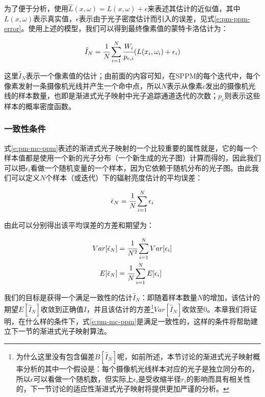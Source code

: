 为了便于分析，\cite{a:ProgressivePhotonMappingAProbabilisticApproach}使用$\hat{L}(x,\omega)=L(x,\omega)+\epsilon$来表述其估计的近似值，其中$L(x,\omega)$表示真实值，$\epsilon$表示由于光子密度估计而引入的误差，见式\ref{e:pm-ppm-error}。使用上述的模型，我们可以得到最终像素值的蒙特卡洛估计为：

\begin{equation}\label{e:pm-mc-ppm}
	\hat{I}_N= \cfrac{1}{N}\sum^{N}_{i=1} \cfrac{W_i}{p_{e,i}}(L(x_i,\omega_i)+\epsilon_i)
\end{equation}

\noindent 这里$\hat{I}_N$表示一个像素值的估计；由前面的内容可知，在SPPM的每个迭代中，每个像素发射一条摄像机光线并产生一个命中点，所以$N$表示从像素$c$发出的摄像机光线的样本数量，也即是渐进式光子映射中光子追踪通道迭代的次数；$p_e$则表示这些样本的概率密度函数。




\subsubsection{一致性条件}\label{sec:pm-pppm-convergence}
式\ref{e:pm-mc-ppm}表述的渐进式光子映射的一个比较重要的属性就是，它的每一个样本值都是使用一个新的光子分布（一个新生成的光子图）计算而得的，因此我们可以把$\epsilon_i$看做一个随机变量的一个样本，因为它依赖于随机分布的光子图。由此我们可以定义$N$个样本（或迭代）下的辐射亮度估计的平均误差：

\begin{equation}
	\bar{\epsilon}_N= \cfrac{1}{N}\sum^{N}_{i=1}\epsilon_i
\end{equation}

\noindent 由此可以分别得出该平均误差的方差和期望为：

\begin{equation}
\begin{aligned}
	Var[\bar{\epsilon}_N]&= \cfrac{1}{N^{2}}\sum^{N}_{i=1}Var[\epsilon_i]\\
	E[\bar{\epsilon}_N]&= \cfrac{1}{N}\sum^{N}_{i=1}E[\epsilon_i]
\end{aligned}
\end{equation}

我们的目标是获得一个满足一致性的估计$\hat{I}_N$：即随着样本数量$N$的增加，该估计的期望$E[\hat{I}_N]$收敛到正确值$I$，并且该估计的方差\footnote{为什么这里没有包含偏差$B[\hat{I}_N]$呢，如前所述，本节讨论的渐进式光子映射概率分析的其中一个假设是：每个摄像机光线样本对应的光子是独立同分布的，所以$\epsilon$可以看做一个随机数，但实际上$\epsilon_i$是受收缩半径$r_i$的影响而具有相关性的，下一节讨论的适应性渐进式光子映射将提供更加严谨的分析。}$Var[\hat{I}_N]$收敛至0。本章我们将证明，在什么样的条件下，式\ref{e:pm-mc-ppm}是满足一致性的，这样的条件将帮助建立下一节的渐进式光子映射算法。

